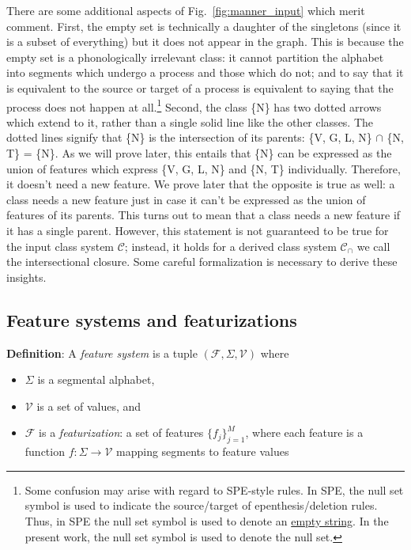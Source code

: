 \documentclass[11pt, oneside]{article}   	%
\begin{document}
There are some additional aspects of Fig.~\ref{fig:manner_input} which merit comment. First, the empty set is technically a daughter of the singletons (since it is a subset of everything) but it does not appear in the graph. This is because the empty set is a phonologically irrelevant class: it cannot partition the alphabet into segments which undergo a process and those which do not; and to say that it is equivalent to the source or target of a process is equivalent to saying that the process does not happen at all.\footnote{Some confusion may arise with regard to SPE-style rules. In SPE, the null set symbol is used to indicate the source/target of epenthesis/deletion rules. Thus, in SPE the null set symbol is used to denote an \underline{empty string}. In the present work, the null set symbol is used to denote the null set.} Second, the class \{N\} has two dotted arrows which extend to it, rather than a single solid line like the other classes. The dotted lines signify that \{N\} is the intersection of its parents: \{V, G, L, N\} $\cap$ \{N, T\} = \{N\}. As we will prove later, this entails that \{N\} can be expressed as the union of features which express \{V, G, L, N\} and \{N, T\} individually. Therefore, it doesn't need a new feature. We prove later that the opposite is true as well: a class needs a new feature just in case it can't be expressed as the union of features of its parents. This turns out to mean that a class needs a new feature if it has a single parent. However, this statement is not guaranteed to be true for the input class system $\mathcal C$; instead, it holds for a derived class system $\mathcal C_\cap$ we call the intersectional closure. Some careful formalization is necessary to derive these insights.

\subsection{Feature systems and featurizations}

\textbf{Definition}: A \textit{feature system} is a tuple $(\mathcal F, \Sigma, \mathcal V)$ where \begin{itemize}
    \item $\Sigma$ is a segmental alphabet, 
    \item $\mathcal V$ is a set of values, and 
    \item $\mathcal F$ is a \textit{featurization}: a set of features $\{f_j\}_{j=1}^M$, where each feature is a function $f: \Sigma \rightarrow \mathcal V$ mapping segments to feature values
    \end{itemize}
\end{document}
